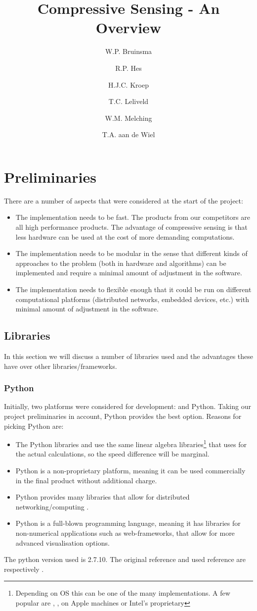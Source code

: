 \documentclass[a4paper, openany, oneside]{memoir}
\title{Compressive Sensing - An Overview}
\author{W.P. Bruinsma \and R.P. Hes \and H.J.C. Kroep \and T.C. Leliveld \and W.M. Melching \and T.A. aan de Wiel}
\begin{document}
\chapter{Preliminaries}
\label{cha:impl:preliminaries}
There are a number of aspects that were considered at the start of the project:
\begin{itemize}
    \item The implementation needs to be fast. The products from our competitors are all high performance products. The advantage of compressive sensing is that less hardware can be used at the cost of more demanding computations.
    \item The implementation needs to be modular in the sense that different kinds of approaches to the problem (both in hardware and algorithms) can be implemented and require a minimal amount of adjustment in the software.
    \item The implementation needs to flexible enough that it could be run on different computational platforms (distributed networks, embedded devices, etc.) with minimal amount of adjustment in the software.
\end{itemize}

\section{Libraries}
\label{sec:libraries}
In this section we will discuss a number of libraries used and the advantages these have over other libraries/frameworks.

\subsection{Python}
\label{sec:python}
Initially, two platforms were considered for development: \matlab{} and Python. Taking our project preliminaries in account, Python provides the best option. Reasons for picking Python are:
\begin{itemize}
    \item The Python libraries  and  use the same linear algebra libraries\footnote{Depending on OS this can be one of the many implementations. A few popular are , ,  on Apple machines or Intel's proprietary } that \matlab{} uses for the actual calculations, so the speed difference will be marginal.
    \item Python is a non-proprietary platform, meaning it can be used commercially in the final product without additional charge.
    \item Python provides many libraries that allow for distributed networking/computing \cite{pythonmp}.
    \item Python is a full-blown programming language, meaning it has libraries for non-numerical applications such as web-frameworks, that allow for more advanced visualisation options.
\end{itemize}
The python version used is 2.7.10. The original reference and used reference are respectively \cite{Rossum:1995:PRM:869369}\cite{python2}.
\end{document}
